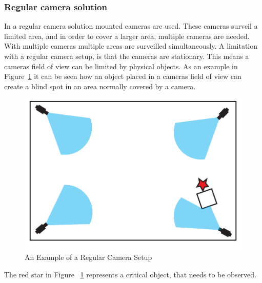 \subsubsection{Regular camera solution}
In a regular camera solution mounted cameras are used.
These cameras surveil a limited area, and in order to cover a larger area, multiple cameras are needed.
With multiple cameras multiple areas are surveilled simultaneously.
A limitation with a regular camera setup, is that the cameras are stationary.
This means a cameras field of view can be limited by physical objects.
As an example in Figure~\ref{fig:refular_camera_setup} it can be seen how an object placed in a cameras field of view can create a blind spot in an area normally covered by a camera.
\begin{figure}[htb]
    \centering
    \includegraphics[width=\textwidth]{gfx/regular_camera_setup.pdf}
    \caption{An Example of a Regular Camera Setup}
    \label{fig:refular_camera_setup}
\end{figure}
The red star in Figure ~\ref{fig:refular_camera_setup} represents a critical object, that needs to be observed.

